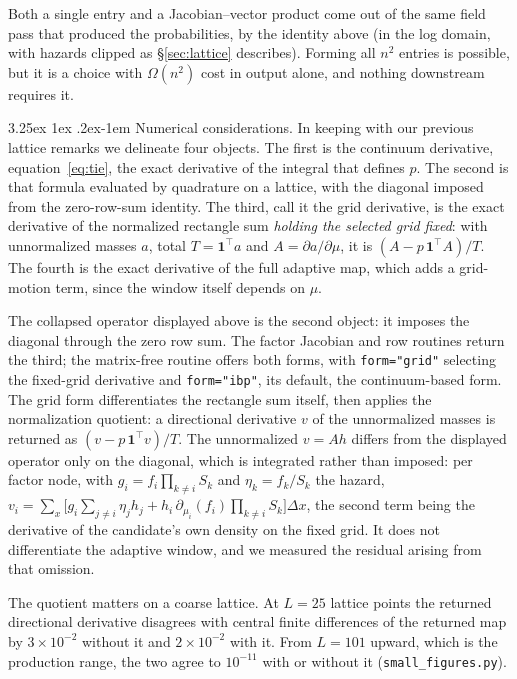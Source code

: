 \documentclass[11pt]{article}
\makeatletter
\renewcommand\paragraph{\@startsection{paragraph}{4}{\z@}%
  {3.25ex \@plus1ex \@minus.2ex}{-1em}%
  {\normalfont\normalsize\itshape}}
\makeatother
\begin{document}
Both a single entry and a
Jacobian--vector product come out of the same field pass that produced
the probabilities, by the identity above (in the log domain, with
hazards clipped as \S\ref{sec:lattice} describes). Forming all $n^{2}$
entries is possible, but it is a choice with $\Omega(n^{2})$ cost in
output alone, and nothing downstream requires it.

\paragraph{Numerical considerations.} In keeping with our
previous lattice remarks we delineate four objects. The first is the continuum
derivative, equation~\eqref{eq:tie}, the exact derivative of the integral
that defines $p$. The second is that formula evaluated by quadrature on a
lattice, with the diagonal imposed from the zero-row-sum identity. The
third, call it the grid derivative, is the exact derivative of the
normalized rectangle sum \emph{holding the selected grid fixed}: with
unnormalized masses $a$, total $T=\mathbf{1}^{\top}a$ and $A=\partial
a/\partial\mu$, it is $(A-p\,\mathbf{1}^{\top}A)/T$. The fourth is the
exact derivative of the full adaptive map, which adds a grid-motion term,
since the window itself depends on $\mu$.

The collapsed operator displayed above is the second object: it imposes
the diagonal through the zero row sum. The factor Jacobian and row routines return the third; the matrix-free routine offers both forms, with \texttt{form="grid"} selecting the fixed-grid derivative and \texttt{form="ibp"}, its default, the continuum-based form. The grid form differentiates the rectangle sum
itself, then applies the normalization quotient: a directional derivative
$v$ of the unnormalized masses is returned as
$(v-p\,\mathbf{1}^{\top}v)/T$. The unnormalized $v=Ah$ differs from the
displayed operator only on the diagonal, which is integrated rather than
imposed: per factor node, with $g_i=f_i\prod_{k\ne i}S_k$ and
$\eta_k=f_k/S_k$ the hazard,
$v_i=\sum_x\bigl[g_i\sum_{j\ne i}\eta_jh_j+h_i\,\partial_{\mu_i}(f_i)\prod_{k\ne i}S_k\bigr]\Delta x$,
the second term being the derivative of the candidate's own density on the
fixed grid. It does not differentiate the adaptive
window, and we measured the residual arising from that omission.

The quotient matters on a coarse lattice. At $L=25$ lattice points the
returned directional derivative disagrees with central finite
differences of the returned map by $3\times10^{-2}$ without it and
$2\times10^{-2}$ with it. From $L=101$ upward, which is the production
range, the two agree to $10^{-11}$ with or without it
(\texttt{small\_figures.py}).
\end{document}
